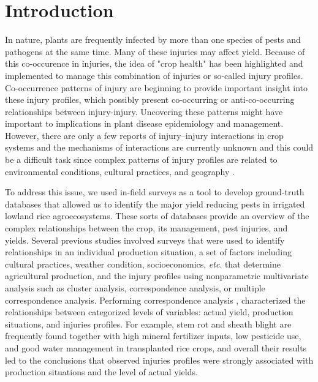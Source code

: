 \section{Introduction}
In nature, plants are frequently infected by more than one species of pests and pathogens at the same time. Many of these injuries may affect yield. Because of this co-occurence in injuries, the idea of "crop health" has been highlighted and implemented to manage this combination of injuries or so-called injury profiles. Co-occurrence patterns of injury are beginning to provide important insight into these injury profiles, which possibly present co-occurring or anti-co-occurring relationships between injury-injury. Uncovering these patterns might have important to implications in plant disease epidemiology and management. However, there are only a few reports of injury–injury interactions in crop systems and the mechanisms of interactions are currently unknown and this could be a difficult task since complex patterns of injury profiles are related to environmental conditions, cultural practices, and geography \cite{Willocquet_2008_Simulating}.

To address this issue, we used in-field surveys as a tool to develop ground-truth databases that allowed us to identify the major yield reducing pests in irrigated lowland rice agroecosystems. These sorts of databases provide an overview of the complex relationships between the crop, its management, pest injuries, and yields. Several previous studies \cite{Savary_2000_Characterization,Savary_2000_Quantification,Dong_2010_Characterization,Reddy_2011_Characterizing} involved surveys that were used to identify relationships in an individual production situation, a set of factors including cultural practices, weather condition, socioeconomics, \textit{etc}. that determine agricultural production, and the injury profiles using nonparametric multivariate analysis such as cluster analysis, correspondence analysis, or multiple correspondence analysis. Performing correspondence analysis \cite{Savary_1995}, characterized the relationships between categorized levels of variables: actual yield, production situations, and injuries profiles. For example, stem rot and sheath blight are frequently found together with high mineral fertilizer inputs, low pesticide use, and good water management in transplanted rice crops, and overall their results led to the conclusions that observed injuries profiles were strongly associated with production situations and the level of actual yields. 

